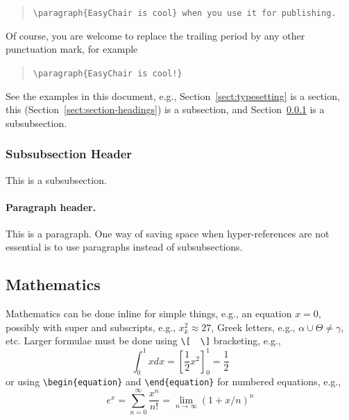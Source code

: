 \documentclass{easychair}
\begin{document}
\begin{quote}
\verb|\paragraph{EasyChair is cool} when you use it for publishing.| 
\end{quote}
Of course, you are welcome to replace the trailing period by any other
punctuation mark, for example 

\begin{quote}
\verb|\paragraph{EasyChair is cool!}|
\end{quote}

See the examples in this document, e.g.,
Section~\ref{sect:typesetting} is a section, this 
(Section~\ref{sect:section-headings}) is a subsection, and
Section~\ref{sect:subsubsection-headings} is a subsubsection.

\subsubsection{Subsubsection Header}
\label{sect:subsubsection-headings}

This is a subsubsection. 

\paragraph{Paragraph header.}

This is a paragraph. 
One way of saving space when hyper-references are not essential is to 
use paragraphs instead of subsubsections.

\subsection{Mathematics}
\label{sect:mathematics}

Mathematics can be done inline for simple things, e.g., an equation
$x = 0$, possibly with super and subscripts, e.g., $x^2_k \approx 27$,
Greek letters, e.g., $\alpha \cup \Theta \ne \gamma$, etc.
Larger formulae must be done using {\tt \verb|\|[}~~{\tt \verb|\|]}
bracketing, e.g.,
\[
\int_{0}^{1} x dx = \left[ \frac{1}{2}x^2 \right]_{0}^{1} = \frac{1}{2}
\]
or using {\tt \verb|\|begin\{equation\}} and {\tt \verb|\|end\{equation\}} for
numbered equations, e.g.,
\begin{equation}
e^x = \sum_{n=0}^\infty \frac{x^n}{n!} = \lim_{n\rightarrow\infty} (1+x/n)^n
\end{equation}
\end{document}

